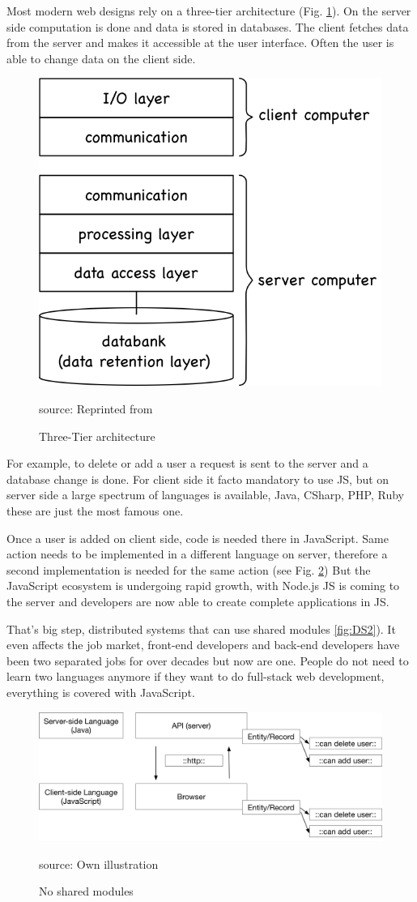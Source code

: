 Most modern web designs rely on a three-tier architecture (Fig. 
\ref{fig:TT}). On the server side computation is done and data 
is stored in databases. The client fetches data from the server and 
makes it accessible at the user interface. Often the user is able 
to change data on the client side. \cite{GOLL}

\begin{figure}[H]
	\centering
	\includegraphics[width=0.5\linewidth]{bilder/grundlagen/Three-Tier.png}
	\caption{Three-Tier architecture} source: Reprinted from \cite{GOLL}
	\label{fig:TT}
\end{figure}

For example, to delete or add a user a request is sent to the 
server and a database change is done. For client side it facto 
mandatory to use \gls{JS}, but on server side  a large spectrum of 
languages is available, Java, CSharp, PHP, Ruby these are just the 
most famous one.

Once a user is added on client side, code is needed there in JavaScript. Same action needs to be implemented in a different language on server, 
therefore a second implementation is needed for the same action (see Fig. \ref{fig:DS1})
But the JavaScript ecosystem is undergoing rapid growth, with Node.js \gls{JS} is coming to the server and developers are now able to create complete applications in \gls{JS}. 

That's big step, distributed systems that can use shared modules \ref{fig:DS2}). It even affects the job market, front-end developers and back-end developers have been two separated jobs for over decades but now are one. People do not need to learn two languages anymore if they want to do full-stack web development, everything is covered with JavaScript.

\begin{figure}[H]
	\centering
	\includegraphics[width=0.8\linewidth]{bilder/grundlagen/Entity1.png}
	\caption{No shared modules} source: Own illustration
	\label{fig:DS1}
\end{figure}

